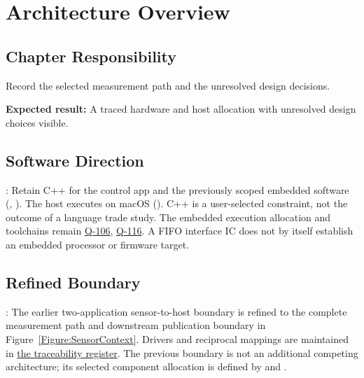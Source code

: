 \chapter{Architecture Overview}
\section{Chapter Responsibility}
\label{Section:ArchitectureOverviewResponsibility}
Record the selected measurement path and the unresolved design decisions.

\noindent\textbf{Expected result:} A traced hardware and host allocation with unresolved design choices visible.

\section{Software Direction}
: Retain C++ for the control app and the previously scoped embedded software (, ). The host executes on macOS (). C++ is a user-selected constraint, not the outcome of a language trade study. The embedded execution allocation and toolchains remain \hyperref[Question:Q-106]{Q-106}, \hyperref[Question:Q-116]{Q-116}. A FIFO interface IC does not by itself establish an embedded processor or firmware target.

\section{Refined Boundary}
: The earlier two-application sensor-to-host boundary is refined to the complete measurement path and downstream publication boundary in Figure~\ref{Figure:SensorContext}. Drivers and reciprocal mappings are maintained in \hyperref[Table:TraceabilityMatrix]{the traceability register}. The previous boundary is not an additional competing architecture; its selected component allocation is defined by  and .

